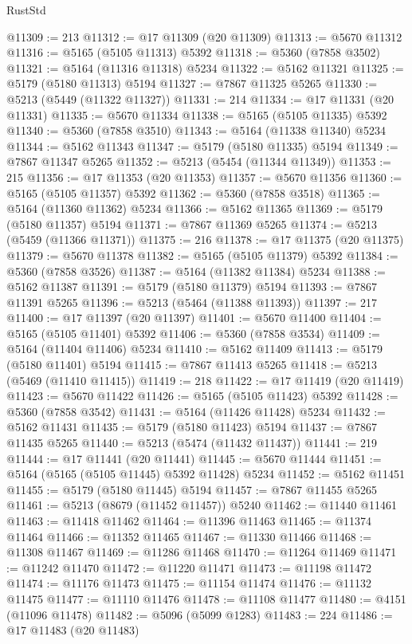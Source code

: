 \begin{lexlean}{RustStd}
\begin{coremodule}
@11309 := 213
@11312 := @17 @11309 (@20 @11309)
@11313 := @5670 @11312
@11316 := @5165 (@5105 @11313) @5392
@11318 := @5360 (@7858 @3502)
@11321 := @5164 (@11316 @11318) @5234
@11322 := @5162 @11321
@11325 := @5179 (@5180 @11313) @5194
@11327 := @7867 @11325 @5265
@11330 := @5213 (@5449 (@11322 @11327))
@11331 := 214
@11334 := @17 @11331 (@20 @11331)
@11335 := @5670 @11334
@11338 := @5165 (@5105 @11335) @5392
@11340 := @5360 (@7858 @3510)
@11343 := @5164 (@11338 @11340) @5234
@11344 := @5162 @11343
@11347 := @5179 (@5180 @11335) @5194
@11349 := @7867 @11347 @5265
@11352 := @5213 (@5454 (@11344 @11349))
@11353 := 215
@11356 := @17 @11353 (@20 @11353)
@11357 := @5670 @11356
@11360 := @5165 (@5105 @11357) @5392
@11362 := @5360 (@7858 @3518)
@11365 := @5164 (@11360 @11362) @5234
@11366 := @5162 @11365
@11369 := @5179 (@5180 @11357) @5194
@11371 := @7867 @11369 @5265
@11374 := @5213 (@5459 (@11366 @11371))
@11375 := 216
@11378 := @17 @11375 (@20 @11375)
@11379 := @5670 @11378
@11382 := @5165 (@5105 @11379) @5392
@11384 := @5360 (@7858 @3526)
@11387 := @5164 (@11382 @11384) @5234
@11388 := @5162 @11387
@11391 := @5179 (@5180 @11379) @5194
@11393 := @7867 @11391 @5265
@11396 := @5213 (@5464 (@11388 @11393))
@11397 := 217
@11400 := @17 @11397 (@20 @11397)
@11401 := @5670 @11400
@11404 := @5165 (@5105 @11401) @5392
@11406 := @5360 (@7858 @3534)
@11409 := @5164 (@11404 @11406) @5234
@11410 := @5162 @11409
@11413 := @5179 (@5180 @11401) @5194
@11415 := @7867 @11413 @5265
@11418 := @5213 (@5469 (@11410 @11415))
@11419 := 218
@11422 := @17 @11419 (@20 @11419)
@11423 := @5670 @11422
@11426 := @5165 (@5105 @11423) @5392
@11428 := @5360 (@7858 @3542)
@11431 := @5164 (@11426 @11428) @5234
@11432 := @5162 @11431
@11435 := @5179 (@5180 @11423) @5194
@11437 := @7867 @11435 @5265
@11440 := @5213 (@5474 (@11432 @11437))
@11441 := 219
@11444 := @17 @11441 (@20 @11441)
@11445 := @5670 @11444
@11451 := @5164 (@5165 (@5105 @11445) @5392 @11428) @5234
@11452 := @5162 @11451
@11455 := @5179 (@5180 @11445) @5194
@11457 := @7867 @11455 @5265
@11461 := @5213 (@8679 (@11452 @11457)) @5240
@11462 := @11440 @11461
@11463 := @11418 @11462
@11464 := @11396 @11463
@11465 := @11374 @11464
@11466 := @11352 @11465
@11467 := @11330 @11466
@11468 := @11308 @11467
@11469 := @11286 @11468
@11470 := @11264 @11469
@11471 := @11242 @11470
@11472 := @11220 @11471
@11473 := @11198 @11472
@11474 := @11176 @11473
@11475 := @11154 @11474
@11476 := @11132 @11475
@11477 := @11110 @11476
@11478 := @11108 @11477
@11480 := @4151 (@11096 @11478)
@11482 := @5096 (@5099 @1283)
@11483 := 224
@11486 := @17 @11483 (@20 @11483)

\end{coremodule}
\end{lexlean}
